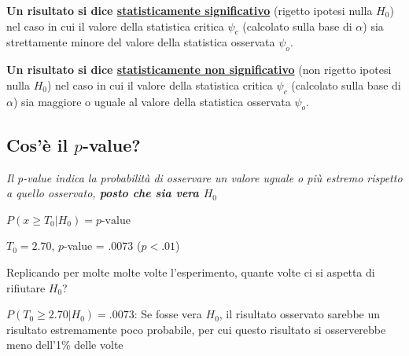 \documentclass[
  ignorenonframetext,
  compress, aspectratio=149]{beamer}
\begin{document}
\begin{frame}{}
\begin{tcolorbox}
\textbf{Un risultato si dice \underline{statisticamente significativo}}
(rigetto ipotesi nulla \(H_0\)) nel caso in cui il valore della
statistica critica \(\psi_c\) (calcolato sulla base di \(\alpha\)) sia
strettamente minore del valore della statistica osservata \(\psi_o\).

\textbf{Un risultato si dice
\underline{statisticamente non significativo}} (non rigetto ipotesi
nulla \(H_0\)) nel caso in cui il valore della statistica critica
\(\psi_c\) (calcolato sulla base di \(\alpha\)) sia maggiore o uguale al
valore della statistica osservata \(\psi_o\).

\end{tcolorbox}
\end{frame}

\subsection{\texorpdfstring{Cos'è il
\(p\)-value?}{Cos'è il p-value?}}\label{cosuxe8-il-p-value}

\begin{frame}{}
\label{section-27}
\begin{center}
\emph{Il p-value indica la probabilità di osservare un valore uguale o più estremo rispetto a quello osservato, \textbf{posto che sia vera $H_0$}}

\vspace{2mm}

$P(x \geq T_0|H_0) = p\text{-value}$
\end{center}

\begin{tcolorbox}[enhanced jigsaw, opacityback=0, arc=.35mm, opacitybacktitle=0.6, rightrule=.15mm, breakable, titlerule=0mm, leftrule=.75mm, title={Un esempio}, toprule=.15mm, toptitle=1mm, coltitle=black, bottomrule=.15mm, bottomtitle=1mm, left=2mm, colframe=quarto-callout-note-color-frame, colback=white, colbacktitle=quarto-callout-note-color!10!white]

\(T_0 = 2.70\), \(p\)-value = \(.0073\) (\(p < .01\))

Replicando per molte molte volte l'esperimento, quante volte ci si
aspetta di rifiutare \(H_0\)?

\(P(T_0 \geq 2.70|H_0) = .0073\): Se fosse vera \(H_0\), il risultato
osservato sarebbe un risultato estremamente poco probabile, per cui
questo risultato si osserverebbe meno dell'1\% delle volte

\end{tcolorbox}
\end{frame}
\end{document}
